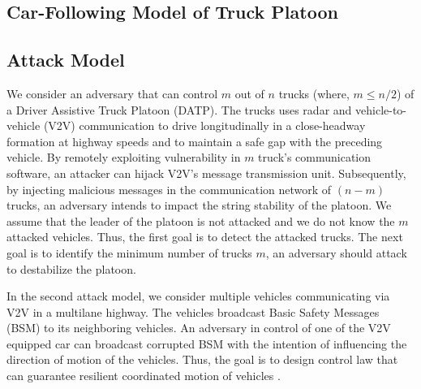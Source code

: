 \subsection{Car-Following Model of Truck Platoon}


\subsection{Attack Model}

We consider an adversary that can control $m$ out of $n$ trucks (where, $m \leq n/2$) of a Driver Assistive Truck Platoon (DATP). The trucks uses radar and vehicle-to-vehicle (V2V) communication to drive longitudinally in a close-headway formation at highway speeds and to maintain a safe gap with the preceding vehicle. By remotely exploiting vulnerability in $m$ truck's communication software, an attacker can hijack V2V's message transmission unit. Subsequently, by injecting malicious messages in the communication network of $(n-m)$ trucks, an adversary intends to impact the string stability of the platoon.  We assume that the leader of the platoon is not attacked and we do not know the $m$ attacked vehicles. Thus, the first goal is to detect the attacked trucks. The next goal is to identify the minimum number of trucks $m$, an adversary should attack to destabilize the platoon. 

In the second attack model, we consider multiple vehicles communicating via V2V in a multilane highway. The vehicles broadcast Basic Safety Messages (BSM) to its neighboring vehicles. An adversary in control of one of the V2V equipped car can broadcast corrupted BSM with the intention of influencing the direction of motion of the vehicles. Thus, the goal is to design control law that can guarantee resilient coordinated motion of vehicles \cite{SSPPK17}.       






